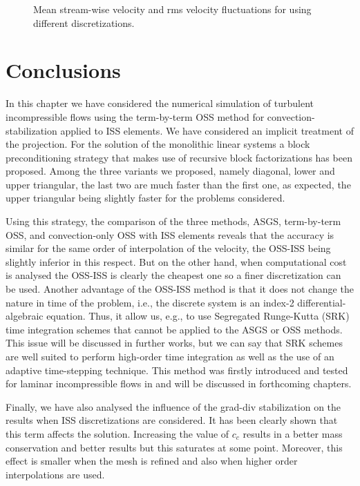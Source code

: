 \begin{figure}[h!]
	\caption{Mean stream-wise velocity and rms velocity fluctuations for using different discretizations.}
	\label{fig-cha_refinement_vel}
\end{figure}

\section{Conclusions}
\label{sec-C5_conclusions}
In this chapter we have considered the numerical simulation of turbulent incompressible flows using the term-by-term OSS method for convection-stabilization applied to ISS elements. We have considered an implicit treatment of the projection. For the solution of the monolithic linear systems a  block preconditioning strategy that makes use of recursive block factorizations has been proposed. Among the three variants we proposed, namely diagonal, lower and upper triangular, the last two are much faster than the first one, as expected, the upper triangular being slightly faster for the problems considered. 

Using this strategy, the comparison of the three methods, ASGS, term-by-term OSS, and convection-only OSS with ISS elements reveals that the accuracy is similar for the same order of interpolation of the velocity, the OSS-ISS being slightly inferior in this respect. But on the other hand, when computational cost is analysed the OSS-ISS is clearly the cheapest one so a finer discretization can be used. Another advantage of the OSS-ISS method is that it does not change the nature in time of the problem, i.e., the discrete system is an index-2 differential-algebraic equation. Thus, it allow us, e.g., to use Segregated Runge-Kutta (SRK) time integration schemes that cannot be applied to the ASGS or OSS methods. This issue will be discussed in further works, but we can say that SRK schemes are well suited to perform high-order time integration as well as the use of an adaptive time-stepping technique. This method was firstly introduced and tested for laminar incompressible flows in \cite{colomes_segregated_2015} and will be discussed in forthcoming chapters.

Finally, we have also analysed the influence of the grad-div stabilization on the results when ISS discretizations are considered. It has been clearly shown that this term affects the solution. Increasing the value of $c_c$ results in a better mass conservation and better results but this saturates at some point. Moreover, this effect is smaller when the mesh is refined and also when higher order interpolations are used.